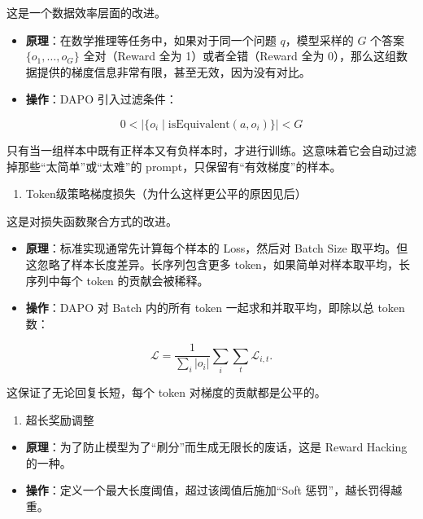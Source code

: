 这是一个数据效率层面的改进。

\begin{itemize}
\tightlist
\item
  \textbf{原理}：在数学推理等任务中，如果对于同一个问题 \(q\)，模型采样的 \(G\) 个答案 \(\{o_1,\ldots,o_G\}\) 全对（Reward 全为 1）或者全错（Reward 全为 0），那么这组数据提供的梯度信息非常有限，甚至无效，因为没有对比。
\item
{}
  \textbf{操作}：DAPO 引入过滤条件：
\end{itemize}

\[
0 < \left|\{o_i \mid \mathrm{isEquivalent}(a,o_i)\}\right| < G
\]

只有当一组样本中既有正样本又有负样本时，才进行训练。这意味着它会自动过滤掉那些``太简单''或``太难''的 prompt，只保留有``有效梯度''的样本。

\begin{enumerate}
\def\labelenumi{\arabic{enumi}.}
\setcounter{enumi}{2}
\tightlist
\item
  Token级策略梯度损失（为什么这样更公平的原因见后）
\end{enumerate}

这是对损失函数聚合方式的改进。

\begin{itemize}
\tightlist
\item
  \textbf{原理}：标准实现通常先计算每个样本的 Loss，然后对 Batch Size 取平均。但这忽略了样本长度差异。长序列包含更多 token，如果简单对样本取平均，长序列中每个 token 的贡献会被稀释。
\item
{}
  \textbf{操作}：DAPO 对 Batch 内的所有 token 一起求和并取平均，即除以总 token 数：
\end{itemize}

\[
\mathcal{L}
=
\frac{1}{\sum_i |o_i|}
\sum_i \sum_t \mathcal{L}_{i,t}.
\]

这保证了无论回复长短，每个 token 对梯度的贡献都是公平的。

\begin{enumerate}
\def\labelenumi{\arabic{enumi}.}
\setcounter{enumi}{3}
\tightlist
\item
  超长奖励调整
\end{enumerate}

\begin{itemize}
\tightlist
\item
  \textbf{原理}：为了防止模型为了``刷分''而生成无限长的废话，这是 Reward Hacking 的一种。
\item
  \textbf{操作}：定义一个最大长度阈值，超过该阈值后施加``Soft 惩罚''，越长罚得越重。
\end{itemize}

